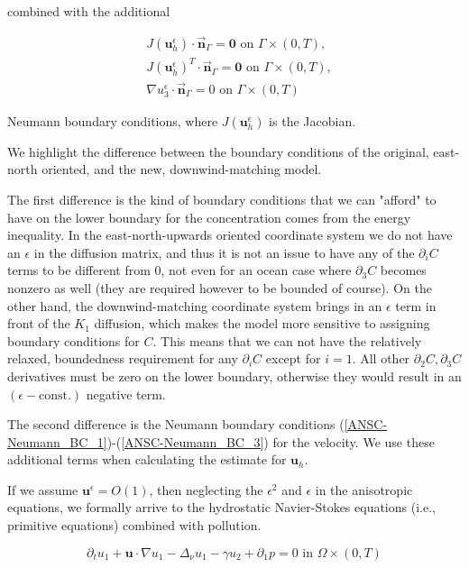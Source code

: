 \documentclass[11pt]{article}
\begin{document}
combined with the additional

    \begin{align}
        & J(\mathbf{u}_h^\epsilon) \cdot \vec{\mathbf{n}}_\Gamma = \mathbf{0} \text{ on } \Gamma \times (0,T), \label{ANSC-Neumann_BC_1} \\
        & J(\mathbf{u}_h^\epsilon)^T \cdot \vec{\mathbf{n}}_\Gamma = \mathbf{0} \text{ on } \Gamma \times (0,T), \label{ANSC-Neumann_BC_2} \\
        & \nabla u^\epsilon_3 \cdot \vec{\mathbf{n}}_\Gamma = 0 \text{ on } \Gamma \times (0,T) \label{ANSC-Neumann_BC_3}
    \end{align}
    
Neumann boundary conditions, where $J(\mathbf{u}_h^\epsilon)$ is the Jacobian.
    
We highlight the difference between the boundary conditions of the original, east-north oriented, and the new, downwind-matching model.

The first difference is the kind of boundary conditions that we can "afford" to have on the lower boundary for the concentration comes from the energy inequality. In the east-north-upwards oriented coordinate system we do not have an $\epsilon$ in the diffusion matrix, and thus it is not an issue to have any of the $\partial_i C$ terms to be different from 0, not even for an ocean case where $\partial_3 C$ becomes nonzero as well (they are required however to be bounded of course). On the other hand, the downwind-matching coordinate system brings in an $\epsilon$ term in front of the $K_1$ diffusion, which makes the model more sensitive to assigning boundary conditions for $C.$ This means that we can not have the relatively relaxed, boundedness requirement for any $\partial_i C$ except for $i=1.$ All other $\partial_2 C, \partial_3 C$ derivatives must be zero on the lower boundary, otherwise they would result in an $(\epsilon - \text{const.})$ negative term.

The second difference is the Neumann boundary conditions (\ref{ANSC-Neumann_BC_1})-(\ref{ANSC-Neumann_BC_3}) for the velocity. We use these additional terms when calculating the estimate for $\mathbf{u}_h.$

If we assume $\mathbf{u}^\epsilon = O(1)$, then neglecting the $\epsilon^2$ and $\epsilon$ in the anisotropic equations, we formally arrive to the hydrostatic Navier-Stokes equations (i.e., primitive equations) combined with pollution.

    \begin{equation} \label{HNSC1}    
    \partial_t u_1 + \mathbf{u} \cdot \nabla u_1 - \Delta_\nu u_1 -\gamma u_2 + \partial_1 p = 0 \text{ in } \Omega \times (0,T)
    \end{equation}
    
\end{document}
